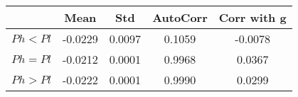 \begin{tiny}\begin{tabular}{|l|c|c|c|c|}
\hline
&\textbf{Mean}&\textbf{Std}&\textbf{AutoCorr}&\textbf{Corr with g}\\\hline
\textbf{$Ph<Pl$}&-0.0229&0.0097&0.1059&-0.0078\\\hline
\textbf{$Ph=Pl$}&-0.0212&0.0001&0.9968&0.0367\\\hline
\textbf{$Ph>Pl$}&-0.0222&0.0001&0.9990&0.0299\\\hline
\end{tabular}
\end{tiny}